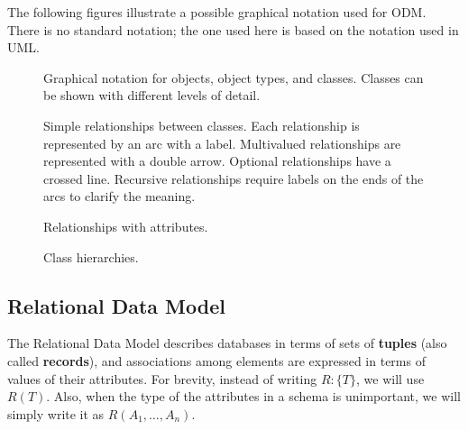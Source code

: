 The following figures illustrate a possible graphical notation used for ODM. There is no standard notation; the one used here is based on the notation used in UML.
\begin{figure}[H]
    \centering
    
    \caption{Graphical notation for objects, object types, and classes. Classes can be shown with different levels of detail.}
\end{figure}
\begin{figure}[H]
    \centering
    
    \caption{Simple relationships between classes. Each relationship is represented by an arc with a label. Multivalued relationships are represented with a double arrow. Optional relationships have a crossed line. Recursive relationships require labels on the ends of the arcs to clarify the meaning.}
\end{figure}
\begin{figure}[H]
    \centering
    
    \caption{Relationships with attributes.}
\end{figure}
\begin{figure}[H]
    \centering
    
    \caption{Class hierarchies.}
\end{figure}

\subsection{Relational Data Model}

The Relational Data Model describes databases in terms of sets of \textbf{tuples} (also called \textbf{records}), and associations among elements are expressed in terms of values of their attributes.
For brevity, instead of writing $R:\{T\}$, we will use $R(T)$. Also, when the type of the attributes in a schema is unimportant, we will simply write it as $R(A_1, \ldots, A_n)$.

